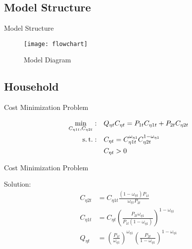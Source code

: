 \documentclass[../quali_slides.tex]{subfiles}
\begin{document}

	\subsection{Model Structure}

	\begin{frame}{Model Structure}
		
		\begin{figure}[h!]
		\centering
		\texttt{[image: flowchart]}
		\caption{Model Diagram}
		\label{fig:model-diagram}
		\end{figure}	
		
	\end{frame}


\subsection{Household}


\begin{frame}{Cost Minimization Problem}
	
	\begin{align}
	\min_{C_{\eta 1 t}, C_{\eta 2 t}}: &\quad Q_{\eta t} C_{\eta t} = P_{1 t} C_{\eta 1t} + P_{2 t} C_{\eta 2t} \label{eq_v2:reg-consumption-cost}
	\\
	\operatorname{s.t.}: &\quad C_{\eta t} = C_{\eta 1 t}^{\omega_{\eta 1}} C_{\eta 2 t}^{1-\omega_{\eta 1}} \label{eq_v2:reg-consumption-aggregation} \\
	&\quad C_{\eta t} > 0 \nonumber
\end{align}
	
\end{frame}


\begin{frame}{Cost Minimization Problem}
	
	Solution:
\begin{align}
	C_{\eta 2 t} &= C_{\eta 1 t} \frac{(1 - \omega_{\eta 1}) P_{1t}}{\omega_{\eta 1} P_{2t}} \label{eq_v2:reg-C-eta-12-t} \\
	C_{\eta 1 t} &= C_{\eta t} \left( \frac{P_{2t} \omega_{\eta 1}}{P_{1t} (1 - \omega_{\eta 1})} \right)^{1-\omega_{\eta 1}} \label{eq_v2:reg-C-eta-1-t} \\
	Q_{\eta t} &= \left( \frac{P_{1 t}}{\omega_{\eta 1}} \right)^{\omega_{\eta 1}} \left( \frac{P_{2 t}}{1 -\omega_{\eta 1}} \right)^{1 -\omega_{\eta 1}} \label{eq_v2:reg-total-expense-level}
\end{align}
	
\end{frame}
\end{document}
